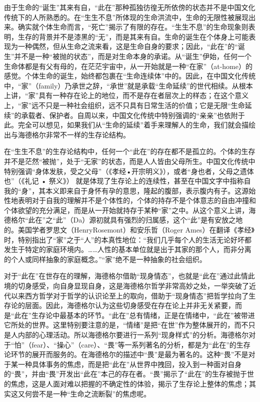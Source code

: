 \documentclass[UTF8, 12pt, a4paper]{ctexrep}
\begin{document}
由于生命的“诞生”其来有自，“此在”那种孤独彷徨无所依傍的状态并不是中国文化传统下的人所熟悉的。在“生生不息”所体现的生命洪流中，生命的无限性被展现出来。确实就个体生命而言，“死亡”揭示了有限的存在。“生生不息”的生命现象则表明，生存的背景并不是漆黑的“无”，而是其来有自。生命的诞生在个体身上可能表现为一种偶然，但从生命之流来看，这是生命自身的要求；因此，“此在”的“诞生”并不是一种“被抛的状态”，而是对生命本身的承诺。从“诞生”伊始，任何一个生命体都是有父有母的，在茫茫宇宙中，从一开始就是一种“在家”（at-home）的感觉。个体生命的诞生，始终都包裹在“生命连续体”中的。因此，在中国文化传统中，“家”（family）乃承世之辞，“承世”就是承载“生命延续”的世代相续。从根本上讲，“家”具有一种存在论上的地位，而不是存在者层次上的样态；在这个意义上，“家”远不只是一种社会组织，远不只具有日常生活的价值；它是无限“生命延续”的承载者、保护者。自周以来，中国文化传统中特别强调的“亲亲”也依附于此。完全可以想见，如果我们从“生命的延续”着手来理解人的生命，我们就会描绘出与海德格尔非常不一样的生存论结构。

在“生生不息”的生存论结构中，任何一个“此在”的存在都不是孤立的。个体的生存并不是茫然“被抛”，处于“无家”的状态，而是人人皆由父母所生。中国文化传统中特别强调“身体发肤，受之父母”（《孝经•开宗明义》），或者“身也者，父母之遗体也”（《礼记 • 祭义》） 就是体现了生存论上的连续性，甚至在中国文字中指称自我的“身”，其本义即来自于身怀有孕的意思，隆起的腹部，表示腹内有子。这源始性地表明对于自我的理解并不是个体性的，个体的持存不是个体意志的自由冲撞和个体欲望的充分满足，而是从一开始就持存于某种“家”之中。从这个意义上讲，海德格尔“此在”之“此”（Da）源初就具有强烈的归属感，这个“此”是有安放之地的。美国学者罗思文（HenryRosemont）和安乐哲（Roger Ames）在翻译《孝经》时，特别指出了“家”之于“人”的本真性地位：“我们几乎每个人的生活无论好坏都发生于特定的家庭环境内。……人性的基本单位就是出于其家的那个人，而非分离的个人或同样抽象的家庭概念。”“家”绝不是一种抽象的社会组织。

对于“此在”在世存在的理解，海德格尔借助“现身情态”，也就是“此在”通过此情此境的切身感受，向自身显现自身，这是海德格尔哲学非常高妙之处，一举突破了近代以来西方哲学对于哲学的认识论至上的取向，借助于“现身情态”把哲学拉向了生存论的层面。因此，海德格尔认为这些切身感受在存在论上并非无关紧要，而是“此在”生存论中最基本的环节。“此在”总有情绪，正是在情绪中，“此在”被带进它所处的世界。这里特别要注意的是，“情绪”是把“在世”作为整体展开的，而不只是人内部的心理活动。所以海德格尔要进行一系列“现身样式”的分析。海德格尔对于“怕”（fear）、“操心”（care）、“畏”等一系列著名的分析，都是为“此在”的生存论环节的展开而服务的。在海德格尔的描述中“畏”是最为著名的。这种“畏”不是对于某一种具体事务的焦虑，而是把“此在”从世界中拽回，投入到一种面对自身的“畏”，并由“畏”开发出“此在”本己的存在者。“畏”揭示了“此在”的生存被抛于世的焦虑，这是人面对难以把握的不确定性的体验，揭示了生存论上整体的焦虑；其实这又何尝不是一种“生命之流断裂”的焦虑呢。
\end{document}
